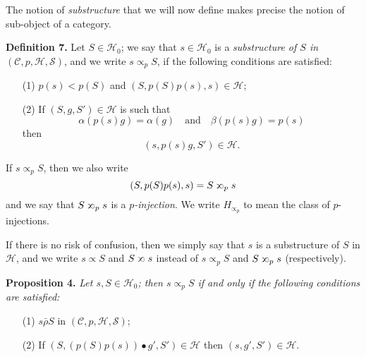 \documentclass[a4paper,oneside,nobib,nofonts,notitlepage,notoc,nols,fleqn,justified]{tufte-book}
\newenvironment{itenv}[1]
  {\phantomsection\par\medskip\noindent\textbf{#1.}\itshape}
  {\par\medskip}
\newenvironment{rmenv}[1]
  {\phantomsection\par\medskip\noindent\textbf{#1.}\rmfamily}
  {\par\medskip}
\newcommand{\CC}{\mathcal{C}}
\newcommand{\HH}{\mathcal{H}}
\renewcommand{\SS}{\mathcal{S}}
\newcommand{\relrhobar}{\mathrel{\bar{\rho}}}
\newcommand{\subs}{\mathrel{\propto}}
\newcommand{\sups}{\mathrel{\reflectbox{$\propto$}}}
\begin{document}
The notion of \emph{substructure} that we will now define makes precise the notion of sub-object of a category.

\begin{rmenv}{Definition 7}
\label{definition:i-7}
  Let $S\in\HH_0$;
  we say that $s\in\HH_0$ is a \emph{substructure of $S$ in $(\CC,p,\HH,\SS)$}, and we write $s\subs_p S$, if the following conditions are satisfied:
  \begin{enumerate}
    \item[\normalfont(1)]
      $p(s)<p(S)$ and $(S,p(S)p(s),s)\in\HH$;
    \item[\normalfont(2)]
      If $(S,g,S')\in\HH$ is such that
      \[
        \alpha(p(s)g)=\alpha(g)
        \quad\text{and}\quad
        \beta(p(s)g)=p(s)
      \]
      then
      \[
        (s,p(s)g,S')\in\HH.
      \]
  \end{enumerate}
  If $s\subs_pS$, then we also write
  \[
    (S,p(S)p(s),s)
    = S\sups_p s
  \]
  and we say that $S\sups_p s$ is a \emph{$p$-injection}.
  We write $H_{\subs_p}$ to mean the class of $p$-injections.
\end{rmenv}

If there is no risk of confusion, then we simply say that $s$ is a substructure of $S$ in $\HH$, and we write $s\subs S$ and $S\sups s$ instead of $s\subs_p S$ and $S\sups_p s$ (respectively).

\begin{itenv}{Proposition 4}
\label{proposition:i-4}
  Let $s,S\in\HH_0$;
  then $s\subs_p S$ if and only if the following conditions are satisfied:
  \begin{enumerate}
    \item[\normalfont(1\textquotesingle)]
      $s\relrhobar S$ in $(\CC,p,\HH,\SS)$;
    \item[\normalfont(2\textquotesingle)]
      If $(S,(p(S)p(s))\bullet g',S')\in\HH$ then $(s,g',S')\in\HH$.
  \end{enumerate}
\end{itenv}
\end{document}
